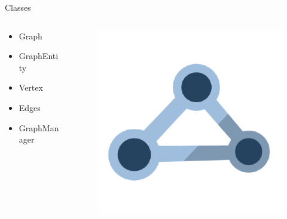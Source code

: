 \begin{frame}{Classes}

    \begin{columns}[T] %
        \begin{column}{.33\textwidth}

            \begin{itemize}
                \setlength{\itemsep}{.5cm}
                \item{Graph}
                \item{GraphEntity}
                \item{Vertex}
                \item{Edges} 
                \item{GraphManager}
            \end{itemize}
        \end{column}%
        \hfill%
        \begin{column}{.67\textwidth}
            \begin{figure}[h]
                \centering
                \includegraphics[scale=.4]{images/graph-interfaces}
            \end{figure}
        \end{column}%
    \end{columns}

\end{frame}

